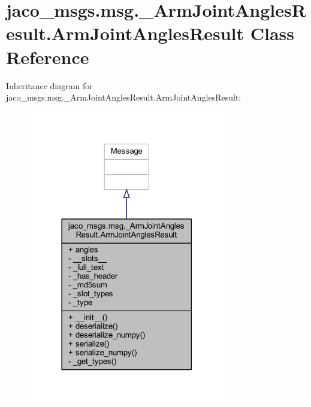 \hypertarget{classjaco__msgs_1_1msg_1_1__ArmJointAnglesResult_1_1ArmJointAnglesResult}{}\section{jaco\+\_\+msgs.\+msg.\+\_\+\+Arm\+Joint\+Angles\+Result.\+Arm\+Joint\+Angles\+Result Class Reference}
\label{classjaco__msgs_1_1msg_1_1__ArmJointAnglesResult_1_1ArmJointAnglesResult}


Inheritance diagram for jaco\+\_\+msgs.\+msg.\+\_\+\+Arm\+Joint\+Angles\+Result.\+Arm\+Joint\+Angles\+Result\+:
\nopagebreak
\begin{figure}[H]
\begin{center}
\leavevmode
\includegraphics[width=242pt]{d7/d42/classjaco__msgs_1_1msg_1_1__ArmJointAnglesResult_1_1ArmJointAnglesResult__inherit__graph}
\end{center}
\end{figure}


